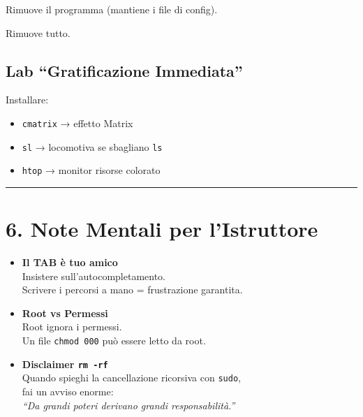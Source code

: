 \documentclass[11pt,a4paper]{article}
\providecommand{\tightlist}{%
  \setlength{\itemsep}{0pt}\setlength{\parskip}{0pt}}
\begin{document}
Rimuove il programma (mantiene i file di config).

\begin{Shaded}
\begin{Highlighting}[]
\end{Highlighting}
\end{Shaded}

Rimuove tutto.

\subsection{Lab ``Gratificazione
Immediata''}\label{lab-gratificazione-immediata}

Installare:

\begin{itemize}
\tightlist
\item
  \texttt{cmatrix} → effetto Matrix
\item
  \texttt{sl} → locomotiva se sbagliano \texttt{ls}
\item
  \texttt{htop} → monitor risorse colorato
\end{itemize}

\begin{center}\rule{0.5\linewidth}{0.5pt}\end{center}

\section{6. Note Mentali per
l'Istruttore}\label{note-mentali-per-listruttore}

\begin{itemize}
\item
  \textbf{Il TAB è tuo amico}\\
  Insistere sull'autocompletamento.\\
  Scrivere i percorsi a mano = frustrazione garantita.
\item
  \textbf{Root vs Permessi}\\
  Root ignora i permessi.\\
  Un file \texttt{chmod\ 000} può essere letto da root.
\item
  \textbf{Disclaimer \texttt{rm\ -rf}}\\
  Quando spieghi la cancellazione ricorsiva con \texttt{sudo},\\
  fai un avviso enorme:\\
  \emph{``Da grandi poteri derivano grandi responsabilità.''}
\end{itemize}
\end{document}
